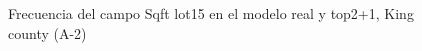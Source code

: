 \begin{figure}[H]
    \centering
    
    \caption{Frecuencia del campo Sqft lot15 en el modelo real y top2+1, King county (A-2)}
    \label{frecuency-top2+1-sqft lot15}
\end{figure}